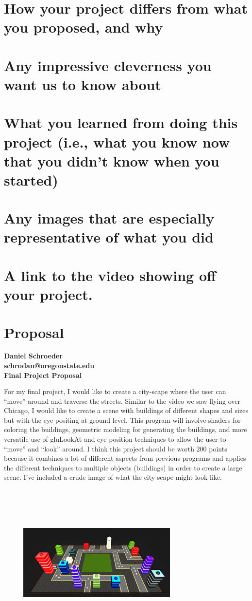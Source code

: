 \documentclass[10pt, draftclsnofoot, onecolumn]{IEEEtran}
\begin{document}
\section{How your project differs from what you proposed, and why}
\section{Any impressive cleverness you want us to know about}
\section{What you learned from doing this project (i.e., what you know now that you didn't know when you started)}
\section{Any images that are especially representative of what you did}
\section{A link to the video showing off your project.}
\newpage
\section{Proposal}
\noindent\textbf{Daniel Schroeder}\\
\textbf{schrodan@oregonstate.edu}\\
\textbf{Final Project Proposal}\\
\vspace{1.5cm}

For my final project, I would like to create a city-scape where the user can ``move'' around and traverse the streets. Similar to the video we saw flying over Chicago, I would like to create a scene with buildings of different shapes and sizes but with the eye positing at ground level. This program will involve shaders for coloring the buildings, geometric modeling for generating the buildings, and more versatile use of gluLookAt and eye position techniques to allow the user to ``move'' and ``look'' around.
I think this project should be worth 200 points because it combines a lot of different aspects from previous programs and applies the different techniques to multiple objects (buildings) in order to create a large scene. I've included a crude image of what the city-scape might look like.

\vspace{1.5cm}
\begin{center} 
\begin{figure}[H]
    \centering
    \includegraphics[width=8cm,height=8cm]{city.eps}
\end{figure}
\end{center}
\end{document}
